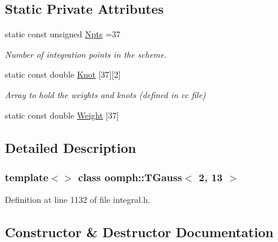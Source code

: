 \subsection*{Static Private Attributes}
\begin{DoxyCompactItemize}
\item 
static const unsigned \hyperlink{classoomph_1_1TGauss_3_012_00_0113_01_4_a1f22b664968ea48225bec386d8c70efe}{Npts} =37
\begin{DoxyCompactList}\small\item\em Number of integration points in the scheme. \end{DoxyCompactList}\item 
static const double \hyperlink{classoomph_1_1TGauss_3_012_00_0113_01_4_aada0c51d07de4719c34d0d554bc9662d}{Knot} \mbox{[}37\mbox{]}\mbox{[}2\mbox{]}
\begin{DoxyCompactList}\small\item\em Array to hold the weights and knots (defined in cc file) \end{DoxyCompactList}\item 
static const double \hyperlink{classoomph_1_1TGauss_3_012_00_0113_01_4_af8c0d8ded8fe2912308157ee2f72c924}{Weight} \mbox{[}37\mbox{]}
\end{DoxyCompactItemize}


\subsection{Detailed Description}
\subsubsection*{template$<$$>$\newline
class oomph\+::\+T\+Gauss$<$ 2, 13 $>$}



Definition at line 1132 of file integral.\+h.



\subsection{Constructor \& Destructor Documentation}
\mbox{\label{classoomph_1_1TGauss_3_012_00_0113_01_4_a122c470f021a4e2edfeb26a4728b5e17}} 
